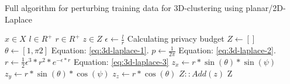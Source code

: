 \begin{algorithm}[H]
  \caption{Full algorithm for perturbing training data for 3D-clustering using planar/2D-Laplace \citep{DBLP:journals/corr/abs-1212-1984}}\label{alg:rq1}
  \begin{algorithmic}
    \Require $x \in X$ 
    \Require $l \in R^ +$
    \Require $r \in R^ +$
    \Ensure $z \in Z$ 
    \State $\epsilon \gets \frac{l}{r}$ \Comment Calculating privacy budget \citep{DBLP:journals/corr/abs-1212-1984}
    \State $Z \gets []$
    \State $\theta \gets [1, \pi2]$       \Comment  Equation: \ref{eq:3d-laplace-1}.
    \State $p \gets \frac{1}{2\pi}$     \Comment Equation: \ref{eq:3d-laplace-2}.
    \State $r \gets \frac{1}{2}\epsilon^3 * r^2 * e^{-\epsilon * r}$          \Comment Equation: \ref{eq:3d-laplace-3}
    \State $z_x \gets r * \sin(\theta) * \sin(\psi)$
    \State $z_y \gets r * \sin(\theta) * \cos(\psi)$
    \State $z_z \gets r * \cos(\theta)$
    \State $Z::Add(z)$  
    \EndFor
    \State \Return Z
  \end{algorithmic}
  \label{alg:3d-laplace}
\end{algorithm}